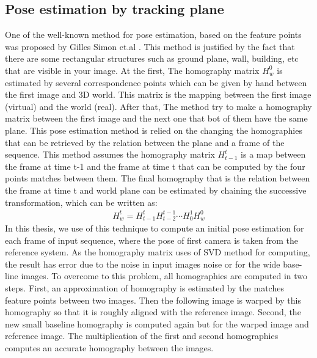 \subsection{Pose estimation by tracking plane}\label{subsec:pose_estimation_planer_tracking}
One of the well-known method for pose estimation, based on the feature points was proposed by Gilles Simon et.al \cite{genc2002marker}. This method is justified by the fact that there are some rectangular structures such as ground plane, wall, building, etc that are visible in your image. At the first, The homography matrix $H_{w}^{0}$ is estimated by several correspondence points which can be given by hand between the first image and 3D world. This matrix is the mapping between the first image (virtual) and the world (real). After that, The method try to make a homography matrix between the first image and the next one that bot of them have the same plane. This pose estimation method is relied on the changing the homographies that can be retrieved by the relation between the plane and a frame of the sequence. This method assumes the homography matrix $H_{t-1}^{t}$ is a map between the frame at time t-1 and the frame at time t that can be computed by the four points matches between them. The final homography that is the relation between the frame at time t and world plane can be estimated by chaining the successive transformation, which can be written as:
\begin{gather*}
	H_{w}^{t} = H_{t-1}^{t} H_{t-2}^{t-1} \cdots H_{0}^{1} H_{w}^{0}
\end{gather*}\label{eq:homography_world_to_refrence}
In this thesis, we use of this technique to compute an initial pose estimation for each frame of input sequence, where the pose of first camera is taken from the reference system. As the homography matrix uses of SVD method for computing, the result has error due to the noise in input images noise or for the wide base-line images. To overcome to this problem, all homographies are computed in two steps. First, an approximation of homography is estimated by the matches feature points between two images. Then the following image is warped by this homography so that it is roughly aligned with the reference image. Second, the new small baseline homography is computed again but for the warped image and reference image. The multiplication of the first and second homographies computes an accurate homography between the images.
